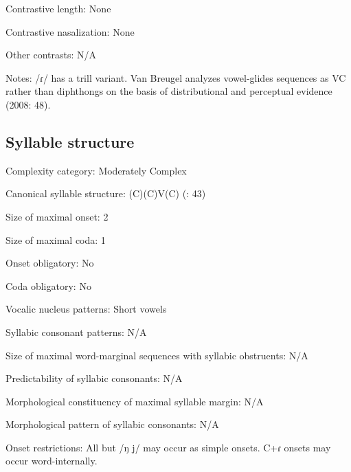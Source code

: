 {\begin{appendixdesc}
\item[Contrastive length:] None

\item[Contrastive nasalization:] None

\item[Other contrasts:] N/A

\item[Notes:] /ɾ/ has a trill variant. Van Breugel analyzes vowel-glides sequences as VC rather than diphthongs on the basis of distributional and perceptual evidence (2008: 48).
\end{appendixdesc}
\subsection*{Syllable structure}
\begin{appendixdesc}

\item[Complexity category:] Moderately Complex

\item[Canonical syllable structure:] (C)(C)V(C) (\citealt{VanBreugel2008}: 43)

\item[Size of maximal onset:] 2

\item[Size of maximal coda:] 1

\item[Onset obligatory:] No

\item[Coda obligatory:] No

\item[Vocalic nucleus patterns:] Short vowels

\item[Syllabic consonant patterns:] N/A

\item[Size of maximal word-marginal sequences with syllabic obstruents:] N/A

\item[Predictability of syllabic consonants:] N/A

\item[Morphological constituency of maximal syllable margin:] N/A

\item[Morphological pattern of syllabic consonants:] N/A

\item[Onset restrictions:] All but /ŋ j/ may occur as simple onsets. C+ɾ onsets may occur word-internally.


\end{appendixdesc}}
